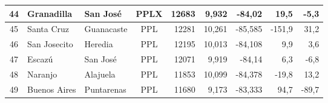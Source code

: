 \begin{longtable}{|c|l|l|c|r|r|r|r|r|}
44 & Granadilla & San José & PPLX & 12683 & 9,932 & -84,02 & 19,5 & -5,3 \\ \hline
45 & Santa Cruz & Guanacaste & PPL & 12281 & 10,261 & -85,585 & -151,9 & 31,2 \\ \hline
46 & San Josecito & Heredia & PPL & 12195 & 10,013 & -84,108 & 9,9 & 3,6 \\ \hline
47 & Escazú & San José & PPL & 12071 & 9,919 & -84,14 & 6,3 & -6,8 \\ \hline
48 & Naranjo & Alajuela & PPL & 11853 & 10,099 & -84,378 & -19,8 & 13,2 \\ \hline
49 & Buenos Aires & Puntarenas & PPL & 11680 & 9,173 & -83,333 & 94,7 & -89,7 \\ \hline

\end{longtable}
